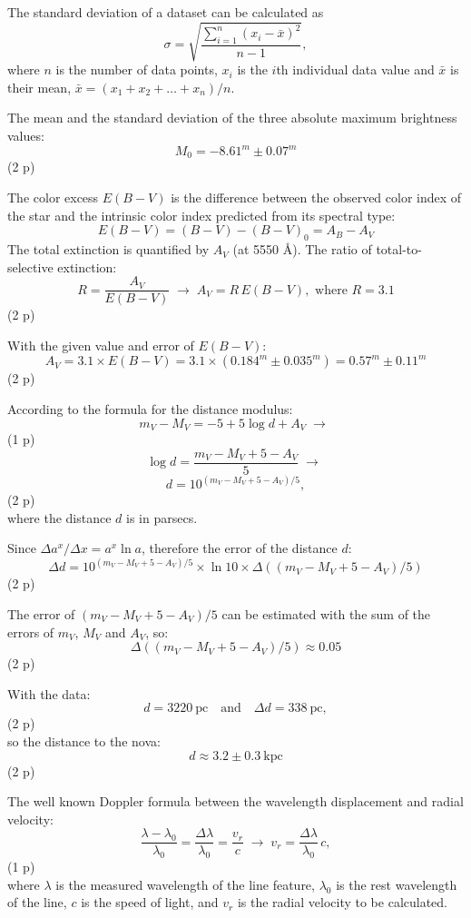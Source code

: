 \begin{description}
  The standard deviation of a dataset can be calculated as
  \[ \sigma = \sqrt{ \frac{\sum\limits_{i=1}^{n} (x_i - \bar{x})^2}{n-1} },
     \tag*{(1.7)} \]
  where $n$ is the number of data points, $x_i$ is the $i$th individual data
  value and $\bar{x}$ is their mean,
  $\bar{x} = (x_1 + x_2 + \ldots + x_n)/n$.

  The mean and the standard deviation of the three absolute maximum
  brightness values:
  \[ M_0 = -8.61^m \pm 0.07^m \]
  \hfill(2 p)

\item[d)] The color excess $E(B-V)$ is the difference between the observed
  color index of the star and the intrinsic color index predicted from its
  spectral type:
  \[ E(B-V) = (B-V) - (B-V)_0 = A_B - A_V
     \tag*{(1.8)} \]
  The total extinction is quantified by $A_V$ (at 5550 \AA). The ratio of
  total-to-selective extinction:
  \[ R = \frac{A_V}{E(B-V)}
     \;\rightarrow\; A_V = R\,E(B-V), \text{ where } R = 3.1
     \tag*{(1.9)} \]
  \hfill(2 p)

  With the given value and error of $E(B-V)$:
  \[ A_V = 3.1 \times E(B-V) = 3.1 \times (0.184^m \pm 0.035^m)
     = 0.57^m \pm 0.11^m \]
  \hfill(2 p)

\item[e)] According to the formula for the distance modulus:
  \[ m_V - M_V = -5 + 5\log d + A_V \;\rightarrow\;
     \tag*{(1.10)} \]
  \hfill(1 p)
  \[ \log d = \frac{m_V - M_V + 5 - A_V}{5} \;\rightarrow\;
     \tag*{(1.11)} \]
  \[ d = 10^{(m_V - M_V + 5 - A_V)/5},
     \tag*{(1.12)} \]
  \hfill(2 p)\\
  where the distance $d$ is in parsecs.

  Since $\Delta a^x / \Delta x = a^x \ln a$, therefore the error of the
  distance $d$:
  \[ \Delta d = 10^{(m_V - M_V + 5 - A_V)/5} \times \ln 10 \times
     \Delta\left( (m_V - M_V + 5 - A_V)/5 \right) \]
  \hfill(2 p)

  The error of $(m_V - M_V + 5 - A_V)/5$ can be estimated with the sum of
  the errors of $m_V$, $M_V$ and $A_V$, so:
  \[ \Delta\left( (m_V - M_V + 5 - A_V)/5 \right) \approx 0.05 \]
  \hfill(2 p)

  With the data:
  \[ d = 3220\ \mathrm{pc} \quad\text{and}\quad \Delta d = 338\ \mathrm{pc}, \]
  \hfill(2 p)\\
  so the distance to the nova:
  \[ d \approx 3.2 \pm 0.3\ \mathrm{kpc} \]
  \hfill(2 p)

\item[f)] The well known Doppler formula between the wavelength displacement
  and radial velocity:
  \[ \frac{\lambda - \lambda_0}{\lambda_0} = \frac{\Delta\lambda}{\lambda_0}
     = \frac{v_r}{c}
     \;\rightarrow\; v_r = \frac{\Delta\lambda}{\lambda_0}\,c,
     \tag*{(1.13)} \]
  \hfill(1 p)\\
  where $\lambda$ is the measured wavelength of the line feature, $\lambda_0$
  is the rest wavelength of the line, $c$ is the speed of light, and $v_r$ is
  the radial velocity to be calculated.


\end{description}
